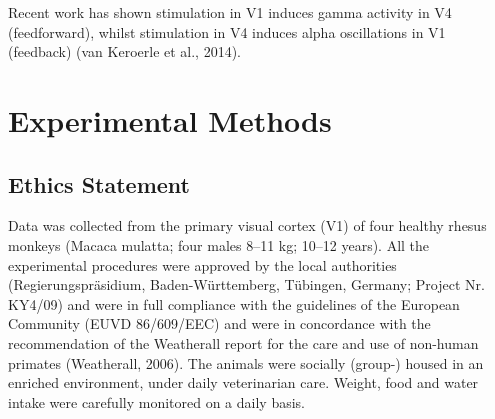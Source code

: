 Recent work has shown stimulation in V1 induces gamma activity in V4 (feedforward), whilst stimulation in V4 induces alpha oscillations in V1 (feedback) (van Keroerle et al., 2014).
\section{Experimental Methods}
\subsection{Ethics Statement}
Data was collected from the primary visual cortex (V1) of four healthy rhesus monkeys (Macaca mulatta; four males 8--11 kg; 10--12 years). All the experimental procedures were approved by the local authorities (Regierungspr\"asidium, Baden-W\"urttemberg, T\"ubingen, Germany; Project Nr. KY4/09) and were in full compliance with the guidelines of the European Community (EUVD 86/609/EEC) and were in concordance with the recommendation of the Weatherall report for the care and use of non-human primates (Weatherall, 2006). The animals were socially (group-) housed in an enriched environment, under daily veterinarian care. Weight, food and water intake were carefully monitored on a daily basis.

